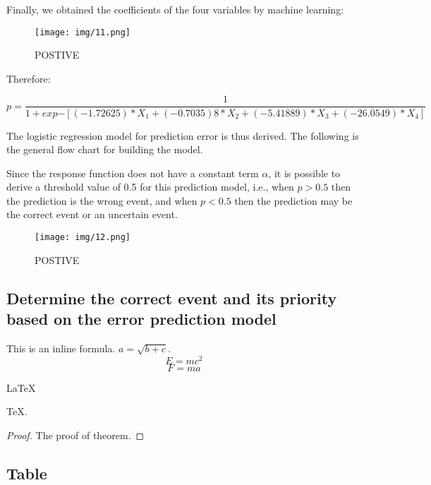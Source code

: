 \documentclass{mcmthesis}
\begin{document}
Finally, we obtained the coefficients of the four variables by machine learning:

\begin{figure}[H]
    \centering
    \texttt{[image: img/11.png]}
    \caption{POSTIVE}
    \label{POSTIVE}
\end{figure}

Therefore:

\begin{equation}
    p=\frac{1}{1+exp{-[(-1.72625)*X_1+(-0.7035)8*X_2+(-5.41889)*X_3+(-26.0549)*X_4]}}
    \label{6}
\end{equation}

The logistic regression model for prediction error is thus derived. The following is the general flow chart for building the model.

Since the response function does not have a constant term $\alpha$, it is possible to derive a threshold value of 0.5 for this prediction model, i.e., when $p > 0.5$ then the prediction is the wrong event, and when $p < 0.5$ then the prediction may be the correct event or an uncertain event.

\begin{figure}[H]
    \centering
    \texttt{[image: img/12.png]}
    \caption{POSTIVE}
    \label{POSTIVE}
\end{figure}

\subsection{Determine the correct event and its priority based on the error prediction model}

This is an inline formula. $a = \sqrt{b + c}$.
\begin{equation}
E = mc^2
\end{equation}
\begin{equation}
F = ma
\end{equation}
\begin{Theorem} \label{thm:latex}
\LaTeX
\end{Theorem}
\begin{Lemma} \label{thm:tex}
\TeX .
\end{Lemma}
\begin{proof}
The proof of theorem.
\end{proof}
 
 
\subsection{Table}
 
\end{document}
